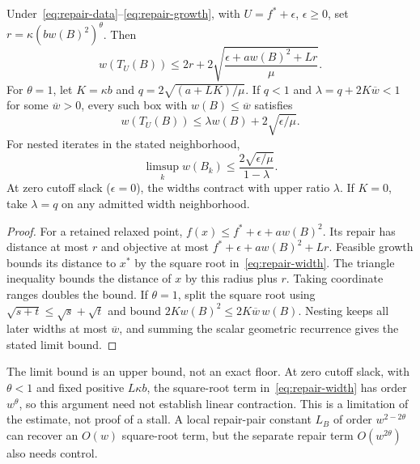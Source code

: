 \begin{theorem}\label{thm:repair}
Under~\eqref{eq:repair-data}--\eqref{eq:repair-growth}, with
$U=f^*+\epsilon$, $\epsilon\ge0$, set
$r=\kappa(bw(B)^2)^\theta$. Then
\begin{equation}\label{eq:repair-width}
 w(T_U(B))\le2r+2\sqrt{\frac{\epsilon+aw(B)^2+Lr}{\mu}}.
\end{equation}
For $\theta=1$, let $K=\kappa b$ and
$q=2\sqrt{(a+LK)/\mu}$. If $q<1$ and
$\lambda=q+2K\overline w<1$ for some $\overline w>0$, every such
box with $w(B)\le\overline w$ satisfies
\begin{equation}\label{eq:repair-recurrence}
 w(T_U(B))\le\lambda w(B)+2\sqrt{\epsilon/\mu}.
\end{equation}
For nested iterates in the stated neighborhood,
\[
 \limsup_k w(B_k)\le\frac{2\sqrt{\epsilon/\mu}}{1-\lambda}.
\]
At zero cutoff slack ($\epsilon=0$), the widths contract with upper
ratio $\lambda$. If $K=0$, take $\lambda=q$ on any admitted width
neighborhood.
\end{theorem}
\begin{proof}
For a retained relaxed point, $f(x)\le f^*+\epsilon+aw(B)^2$.
Its repair has distance at most $r$ and objective at most
$f^*+\epsilon+aw(B)^2+Lr$. Feasible growth bounds its distance to
$x^*$ by the square root in~\eqref{eq:repair-width}. The triangle
inequality bounds the distance of $x$ by this radius plus $r$.
Taking coordinate ranges doubles the bound. If $\theta=1$, split the
square root using $\sqrt{s+t}\le\sqrt s+\sqrt t$ and bound
$2Kw(B)^2\le2K\overline w\,w(B)$. Nesting keeps all later widths
at most $\overline w$, and summing the scalar geometric recurrence
gives the stated limit bound.
\end{proof}

The limit bound is an upper bound, not an exact floor. At zero cutoff
slack, with
$\theta<1$ and fixed positive $L\kappa b$, the square-root term
in~\eqref{eq:repair-width} has order $w^\theta$, so this argument
need not establish linear contraction. This is a limitation of the
estimate, not proof of a stall. A local repair-pair constant $L_B$ of
order $w^{2-2\theta}$ can recover an $O(w)$ square-root term, but
the separate repair term $O(w^{2\theta})$ also needs control.

